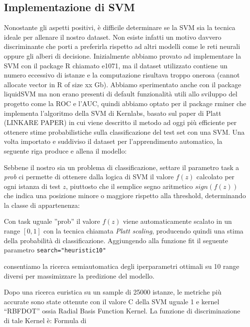 \subsection{Implementazione di SVM}

Nonostante gli aspetti positivi, è difficile determinare se la SVM sia la tecnica ideale per allenare il nostro dataset. Non esiste infatti un motivo davvero discriminante che porti a preferirla rispetto ad altri modelli come le reti neurali oppure gli alberi di decisione.
Inizialmente abbiamo provato ad implementare la SVM con il package R chiamato e1071, ma il dataset utilizzato contiene un numero eccessivo di istanze e la computazione risultava troppo onerosa (cannot allocate vector in R of size xx Gb). Abbiamo sperimentato anche con il package liquidSVM ma non erano presenti di default funzionalità utili allo sviluppo del progetto come la ROC e l'AUC, quindi abbiamo optato per il package rminer che implementa l’algoritmo della SVM di Kernlabs, basato sul paper di Platt (LINKARE PAPER) in cui viene descritto il metodo ad oggi più efficiente per ottenere stime probabilistiche sulla classificazione del test set con una SVM.
Una volta importato e suddiviso il dataset per l’apprendimento automatico, la seguente riga produce e allena il modello:

\texttt{}

Sebbene il nostro sia un problema di classificazione, settare il parametro task a \textit{prob} ci permette di ottenere dalla logica di SVM il valore $ f(z) $ calcolato per ogni istanza di test $z$, piuttosto che il semplice segno aritmetico $sign(f(z))$ che indica una posizione minore o maggiore rispetto alla threshold, determinando la classe di appartenenza:




Con task uguale ”prob” il valore $f(z)$ viene automaticamente scalato in un range $[0, 1]$ con la tecnica chiamata \textit{Platt scaling}, producendo quindi una stima della probabilità di classificazione.
Aggiungendo alla funzione fit il seguente parametro \texttt{search="heuristic10"}

consentiamo la ricerca semiautomatica degli iperparametri ottimali su 10 range diversi per massimizzare la predizione del modello.

Dopo una ricerca euristica su un sample di 25000 istanze, le metriche più accurate sono state ottenute con il valore C della SVM uguale 1 e kernel “RBFDOT” ossia Radial Basis Function Kernel.
La funzione di discriminazione di tale Kernel è:
Formula di 



